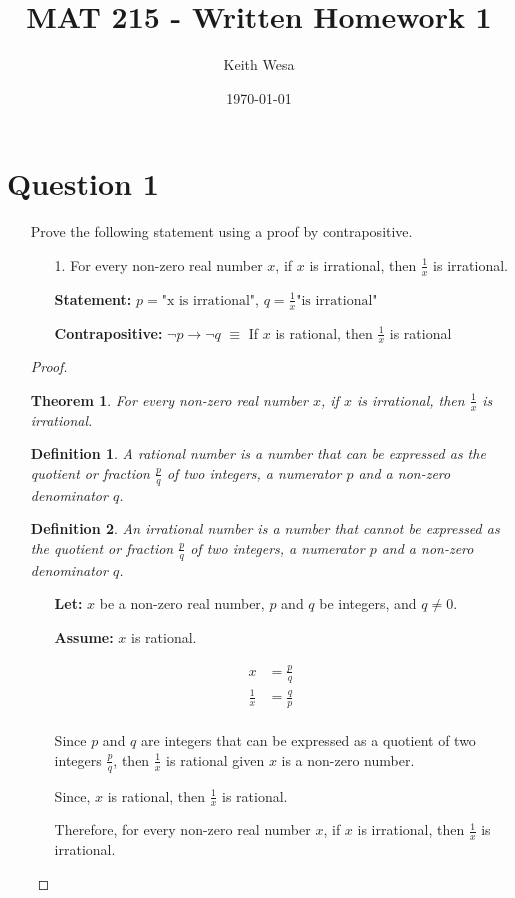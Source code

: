 \documentclass{article}
\author{Keith Wesa}
\title{MAT 215 - Written Homework 1}
\date{\today}
\newtheorem*{theorem}{Theorem}
\newtheorem*{definition}{Definition}
\begin{document}
\section*{Question 1}
\begin{itemize}
    \item[] Prove the following statement using a proof by contrapositive.
    \begin{itemize}
        \item[1.] For every non-zero real number $x$, if $x$ is irrational, then $\frac{1}{x}$ is irrational.
        \item[] 
        \item[] \textbf{Statement:} $p = \text{"x is irrational"}$, $q = \frac{1}{x} \text{"is irrational"}$
        \item[] \textbf{Contrapositive:} $\lnot p \rightarrow \lnot q$ $\equiv$ If $x$ is rational, then $\frac{1}{x}$ is rational
    \end{itemize}
    \begin{proof}
        \begin{theorem}
            For every non-zero real number $x$, if $x$ is irrational, then $\frac{1}{x}$ is irrational.
        \end{theorem}
        \begin{definition}
            A rational number is a number that can be expressed as the quotient or fraction $\frac{p}{q}$ of two integers, a numerator $p$ and a non-zero denominator $q$.
        \end{definition}
        \begin{definition}
            An irrational number is a number that cannot be expressed as the quotient or fraction $\frac{p}{q}$ of two integers, a numerator $p$ and a non-zero denominator $q$.
        \end{definition}
        \begin{itemize}
            \item[] \textbf{Let:} $x$ be a non-zero real number, $p$ and $q$ be integers, and $q \neq 0$.
            \item[] \textbf{Assume:} $x$ is rational.
        \end{itemize}
        \begin{align*}
            x &= \frac{p}{q} \\
            \frac{1}{x} &= \frac{q}{p} \\
        \end{align*}
        \begin{itemize}
            \item[] Since $p$ and $q$ are integers that can be expressed as a quotient of two integers $\frac{p}{q}$, then $\frac{1}{x}$ is rational given $x$ is a non-zero number.
            \item[] Since, $x$ is rational, then $\frac{1}{x}$ is rational.
            \item[] Therefore, for every non-zero real number $x$, if $x$ is irrational, then $\frac{1}{x}$ is irrational.
        \end{itemize}
    \end{proof}
\end{itemize}
\end{document}
